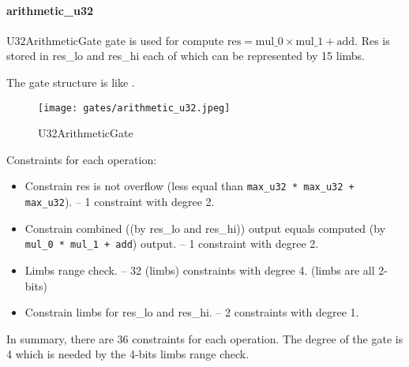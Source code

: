 \paragraph{arithmetic\_u32}

\hspace*{\fill}

\indent U32ArithmeticGate gate is used for compute $\text{res} = \text{mul\_0} \times \text{mul\_1} + \text{add}$. Res is stored in res\_lo and res\_hi each of which can be represented by 15 limbs.

The gate structure is like .

\begin{figure}[!ht]
    \centering
    \texttt{[image: gates/arithmetic\_u32.jpeg]}
    \caption{U32ArithmeticGate}
    \label{fig:arithmetic-u32}
\end{figure}

Constraints for each operation:
\begin{itemize}
    \item Constrain res is not overflow (less equal than \verb|max_u32 * max_u32 + max_u32|). -- 1 constraint with degree 2.
    \item Constrain combined ((by res\_lo and res\_hi)) output equals computed (by \verb|mul_0 * mul_1 + add|) output. -- 1 constraint with degree 2.
    \item Limbs range check. -- 32 (limbs) constraints with degree 4. (limbs are all 2-bits)
    \item Constrain limbs for res\_lo and res\_hi. -- 2 constraints with degree 1.
\end{itemize}

In summary, there are 36 constraints for each operation. The degree of the gate is 4 which is needed by the 4-bits limbs range check.
